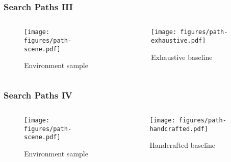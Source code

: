\begin{frame}
    \frametitle{Search Paths III}

    \begin{columns}
        \begin{column}{0.5\textwidth}
            \begin{figure}
                \centering
                \texttt{[image: figures/path-scene.pdf]}
                \par Environment sample
            \end{figure}
        \end{column}
        \begin{column}{0.5\textwidth}
            \begin{figure}
                \centering
                \texttt{[image: figures/path-exhaustive.pdf]}
                \par Exhaustive baseline
            \end{figure}
        \end{column}
    \end{columns}
\end{frame}

\begin{frame}
    \frametitle{Search Paths IV}

    \begin{columns}
        \begin{column}{0.5\textwidth}
            \begin{figure}
                \centering
                \texttt{[image: figures/path-scene.pdf]}
                \par Environment sample
            \end{figure}
        \end{column}
        \begin{column}{0.5\textwidth}
            \begin{figure}
                \centering
                \texttt{[image: figures/path-handcrafted.pdf]}
                \par Handcrafted baseline
            \end{figure}
        \end{column}
    \end{columns}
\end{frame}

